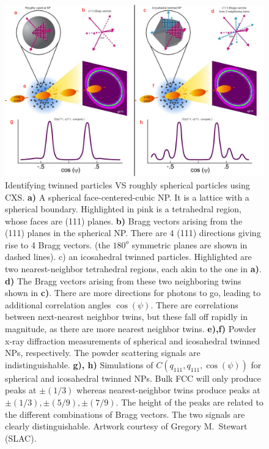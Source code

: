 \documentclass [11pt,fleqn]{article}
\begin{document}
\begin{figure}[h]
\begin{center}
\includegraphics[width=\textwidth,height=\textheight,keepaspectratio]{./8871A01_v04_update.png}
\end{center}
\caption{Identifying twinned particles VS roughly spherical particles using CXS. \textbf{a)} A spherical face-centered-cubic NP. It is a lattice with a spherical boundary. Highlighted in pink is a tetrahedral region, whose faces are (111) planes. \textbf{b)} Bragg vectors arising from the (111) planes in the spherical NP. There are 4 (111) directions giving rise to 4 Bragg vectors. (the $180^o$ symmetric planes are shown in dashed lines). c) an icosahedral twinned particles. Highlighted are two nearest-neighbor tetrahedral regions, each akin to the one in \textbf{a)}. \textbf{d)} The Bragg vectors arising from these two neighboring twins shown in \textbf{c)}. There are more directions for photons to go, leading to additional correlation angles $\cos(\psi)$. There are correlations between next-nearest neighbor twins, but these fall off rapidly in magnitude, as there are more nearest neighbor twins. \textbf{e),f)} Powder x-ray diffraction measurements of spherical and icosahedral twinned NPs, respectively. The powder scattering signals are indistinguishable.  \textbf{g), h)} Simulations of $C(q_{111},q_{111},\cos(\psi) )$ for spherical and icosahedral twinned NPs. Bulk FCC will only produce peaks at $\pm (1/3)$ whereas nearest-neighbor twins produce peaks at $\pm (1/3), \pm (5/9), \pm (7/9)$. The height of the peaks are related to the different combinations of Bragg vectors. The two signals are clearly distinguishable. Artwork courtesy of Gregory M.~Stewart (SLAC).}
\label{fig:contrast}
\end{figure}
\end{document}
